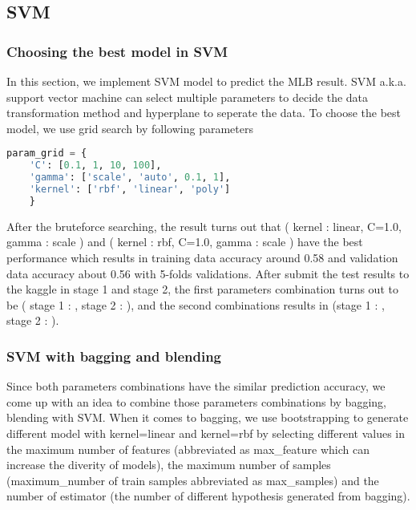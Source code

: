 \subsection*{SVM}

\subsubsection*{Choosing the best model in SVM}

\quad In this section, we implement SVM model to predict the MLB result. 
SVM a.k.a. support vector machine can select multiple parameters to decide the data transformation method 
and hyperplane to seperate the data. To choose the best model, we use grid search by following parameters
\begin{lstlisting}[language=Python]
    param_grid = {
    'C': [0.1, 1, 10, 100],
    'gamma': ['scale', 'auto', 0.1, 1],
    'kernel': ['rbf', 'linear', 'poly']
    }
\end{lstlisting}
\quad After the bruteforce searching, the result turns out that 
( kernel : linear, C=1.0, gamma : scale ) and ( kernel : rbf, C=1.0, gamma : scale ) have the best performance 
which results in training data accuracy around 0.58 and validation data accuracy about 0.56 with 5-folds validations.
After submit the test results to the kaggle in stage 1 and stage 2, 
the first parameters combination turns out to be ( stage 1 : , stage 2 : ), and the second combinations results in (stage 1 : , stage 2 : ).

\subsubsection*{SVM with bagging and blending}

\quad Since both parameters combinations have the similar prediction accuracy, we come up with an idea to combine those parameters combinations by 
bagging, blending with SVM. When it comes to bagging, we use bootstrapping to generate different model  
with kernel=linear and kernel=rbf by selecting different values in the maximum number of features 
(abbreviated as max\_feature which can increase the diverity of models), the maximum number of samples (maximum\_number of train samples 
abbreviated as max\_samples) and the number of estimator (the number of different hypothesis generated from bagging).

